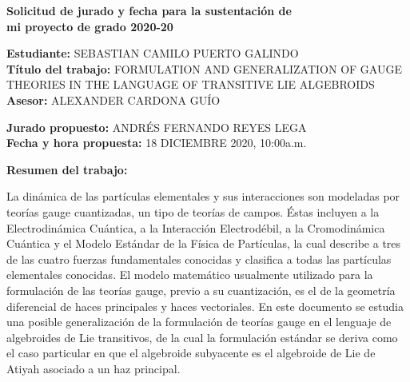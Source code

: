 \documentclass{article}
\begin{document}
\begin{center}
   \bf\Large Solicitud de jurado y fecha para la sustentaci\'on de\\
   mi proyecto de grado 2020-20
\end{center}
\bigskip
\bigskip
\bigskip

\noindent
{\bf Estudiante:} SEBASTIAN CAMILO PUERTO GALINDO\\
{\bf T\'itulo del trabajo:} FORMULATION AND GENERALIZATION OF GAUGE THEORIES IN THE LANGUAGE OF TRANSITIVE LIE ALGEBROIDS\\
{\bf Asesor:} ALEXANDER CARDONA GUÍO\\
\bigskip


\noindent
{\bf Jurado propuesto:} ANDRÉS FERNANDO REYES LEGA\\
{\bf Fecha y hora propuesta:} 18 DICIEMBRE 2020, 10:00a.m.
\bigskip

\noindent


\smallskip

\noindent
{\bf Resumen del trabajo:}


\noindent

La dinámica de las partículas elementales y sus interacciones son modeladas por teorías gauge cuantizadas, un tipo de teorías de campos. Éstas incluyen a la Electrodinámica Cuántica, a la Interacción Electrodébil, a la Cromodinámica Cuántica y el Modelo Estándar de la Física de Partículas, la cual describe a tres de las cuatro fuerzas fundamentales conocidas y clasifica a todas las partículas elementales conocidas. El modelo matemático usualmente utilizado para la formulación de las teorías gauge, previo a su cuantización, es el de la geometría diferencial de haces principales y haces vectoriales. En este documento se estudia una posible generalización de la formulación de teorías gauge en el lenguaje de algebroides de Lie transitivos, de la cual la formulación estándar se deriva como el caso particular en que el algebroide subyacente es el algebroide de Lie de Atiyah asociado a un haz principal.
\end{document}
